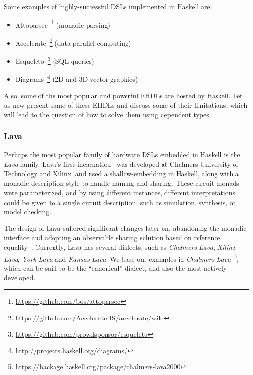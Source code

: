             Some examples of highly-successful \acp{DSL} implemented in Haskell are:

            \begin{itemize}
                \item Attoparsec~\footnote{\url{https://github.com/bos/attoparsec}} (monadic parsing)
                \item Accelerate~\footnote{\url{https://github.com/AccelerateHS/accelerate/wiki}} (data-parallel computing)
                \item Esqueleto~\footnote{\url{https://github.com/prowdsponsor/esqueleto}} (SQL queries)
                \item Diagrams~\footnote{\url{http://projects.haskell.org/diagrams/}} (2D and 3D vector graphics)
            \end{itemize}

            Also, some of the most popular and powerful \acp{EHDL} are hosted by Haskell.
            Let us now present some of these \acp{EHDL} and discuss some of their limitations,
            which will lead to the question of how to solve them using dependent types.

            \subsubsection{Lava}
            Perhaps the most popular family of hardware \acp{DSL} embedded in Haskell is the \emph{Lava} family.
            Lava's first incarnation~\cite{lava-1999} was developed at Chalmers University of Technology
            and Xilinx, and used a shallow-embedding in Haskell, along with a monadic description style
            to handle naming and sharing.
            These circuit monads were parameterized, and by using different instances,
            different interpretations could be given to a single circuit description, such as
            simulation, synthesis, or model checking.

            The design of Lava suffered significant changes later on, abandoning the monadic interface
            and adopting an observable sharing solution based on reference equality~\cite{observable-sharing-circuits}.
            Currently, Lava has several dialects, such as \emph{Chalmers-Lava}, \emph{Xilinx-Lava}, \emph{York-Lava} and \emph{Kansas-Lava}.
            We base our examples in \emph{Chalmers-Lava}~\footnote{\url{https://hackage.haskell.org/package/chalmers-lava2000}},
            which can be said to be the ``canonical'' dialect, and also the most actively developed.

